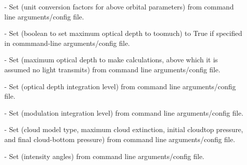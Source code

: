 \documentclass[letterpaper,12pt]{article}
\begin{document}
\begin{enumerate}[leftmargin=10pt, noitemsep, parsep=0pt, topsep=0ex]
\item[-] Set  (unit conversion factors for above orbital parameters) from command line arguments/config file.
\item[-] Set  (boolean to set maximum optical depth to toomuch) to True if specified in commmand-line arguments/config file.
\item[-] Set  (maximum optical depth to make calculations, above which it is assumed no light transmits) from command line arguments/config file.
\item[-] Set  (optical depth integration level) from command line arguments/config file.
\item[-] Set  (modulation integration level) from command line arguments/config file.
\item[-] Set  (cloud model type, maximum cloud extinction, initial cloudtop pressure, and final cloud-bottom pressure) from command line arguments/config file.
\item[-] Set  (intensity angles) from command line arguments/config file.
\end{enumerate}
\end{document}
